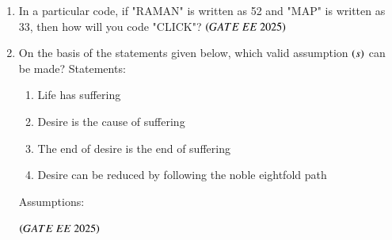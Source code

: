 \documentclass[journal,12pt,onecolumn]{IEEEtran}
\theoremstyle{remark}
\begin{document}
\begin{enumerate}
   \item In a particular code, if "RAMAN" is written as 52 and "MAP" is written as 33, then how will you code "CLICK"?      
\hfill $\left(GATE\ EE\ 2025\right)$
    \begin{enumerate}
    \end{enumerate}

   \item On the basis of the statements given below, which valid assumption $\left(s\right)$ can be
made?    
      Statements:
\begin{enumerate}

    \item Life has suffering
    \item Desire is the cause of suffering
    \item The end of desire is the end of suffering
    \item Desire can be reduced by following the noble eightfold path
\end{enumerate}
Assumptions:
\begin{enumerate}
 \end{enumerate}    
\hfill $\left(GATE\ EE\ 2025\right)$
    \begin{enumerate}
     \end{enumerate}


\end{enumerate}
\end{document}
